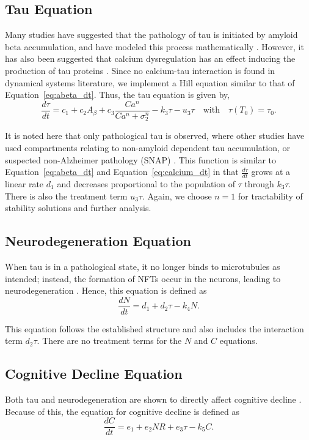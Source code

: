 \documentclass[12pt]{article}
\theoremstyle{definition}
\begin{document}
\subsection{Tau Equation}
Many studies have suggested that the pathology of tau is initiated by amyloid beta accumulation, and have modeled this process mathematically \cite{hao2022optimal, zheng2002amyloid}. However, it has also been suggested that calcium dysregulation has an effect inducing the production of tau proteins \cite{guan2021elevating}. Since no calcium-tau interaction is found in dynamical systems literature, we implement a Hill equation similar to that of Equation~\eqref{eq:abeta_dt}. Thus, the tau equation is given by, 
\begin{equation}
    \frac{d \tau}{dt} = c_{1} + c_{2} A_{\beta} + c_{3} \frac{Ca^n}{Ca^n + \sigma_2^n} - k_{3} \tau - u_{3} \tau \quad \text{with} \quad \tau(T_0) = \tau_{0}.
    \label{eq:tau}
\end{equation}

It is noted here that only pathological tau is observed, where other studies have used compartments relating to non-amyloid dependent tau accumulation, or suspected non-Alzheimer pathology (SNAP) \cite{hao2022optimal, petrella2019computational}. This function is similar to Equation~\eqref{eq:abeta_dt} and Equation~\eqref{eq:calcium_dt} in that $\frac{d\tau}{dt}$ grows at a linear rate $d_1$ and decreases proportional to the population of $\tau$ through $k_3 \tau$. There is also the treatment term $u_3 \tau$. Again, we choose $n=1$ for tractability of stability solutions and further analysis. \bigskip

\subsection{Neurodegeneration Equation}
When tau is in a pathological state, it no longer binds to microtubules as intended; instead, the formation of NFTs occur in the neurons, leading to neurodegeneration \cite{ballatore2007tau}. Hence, this equation is defined as 
\begin{equation*}
    \frac{dN}{dt}=d _{1}+d _{2}\tau-k _{4}N.
\end{equation*}

This equation follows the established structure and also includes the interaction term $d_2 \tau$. There are no treatment terms for the $N$ and $C$ equations. \bigskip

\subsection{Cognitive Decline Equation}
Both tau and neurodegeneration are shown to directly affect cognitive decline \cite{bejanin2017tau, hao2022optimal}. Because of this, the equation for cognitive decline is defined as 
\begin{equation*}
    \frac{dC}{dt}=e _{1}+e _{2}NR + e _{3}\tau-k _{5}C.
\end{equation*}
\end{document}
